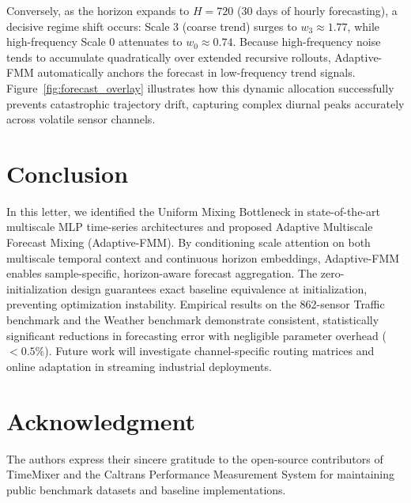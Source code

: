 \documentclass[journal]{IEEEtran}
\begin{document}
Conversely, as the horizon expands to $H = 720$ (30 days of hourly forecasting), a decisive regime shift occurs: Scale 3 (coarse trend) surges to $w_3 \approx 1.77$, while high-frequency Scale 0 attenuates to $w_0 \approx 0.74$. Because high-frequency noise tends to accumulate quadratically over extended recursive rollouts, Adaptive-FMM automatically anchors the forecast in low-frequency trend signals. Figure~\ref{fig:forecast_overlay} illustrates how this dynamic allocation successfully prevents catastrophic trajectory drift, capturing complex diurnal peaks accurately across volatile sensor channels.

\section{Conclusion}
\label{sec:conclusion}

In this letter, we identified the Uniform Mixing Bottleneck in state-of-the-art multiscale MLP time-series architectures and proposed Adaptive Multiscale Forecast Mixing (Adaptive-FMM). By conditioning scale attention on both multiscale temporal context and continuous horizon embeddings, Adaptive-FMM enables sample-specific, horizon-aware forecast aggregation. The zero-initialization design guarantees exact baseline equivalence at initialization, preventing optimization instability. Empirical results on the 862-sensor Traffic benchmark and the Weather benchmark demonstrate consistent, statistically significant reductions in forecasting error with negligible parameter overhead ($<0.5\%$). Future work will investigate channel-specific routing matrices and online adaptation in streaming industrial deployments.

\section*{Acknowledgment}
The authors express their sincere gratitude to the open-source contributors of TimeMixer and the Caltrans Performance Measurement System for maintaining public benchmark datasets and baseline implementations.
\end{document}
